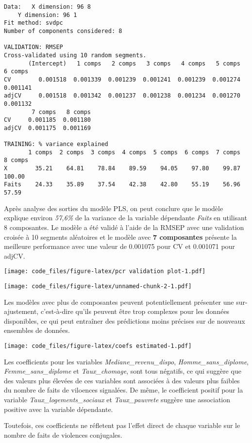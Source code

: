\documentclass[
]{article}
\begin{document}
\begin{verbatim}
Data:   X dimension: 96 8 
    Y dimension: 96 1
Fit method: svdpc
Number of components considered: 8

VALIDATION: RMSEP
Cross-validated using 10 random segments.
       (Intercept)   1 comps   2 comps   3 comps   4 comps   5 comps   6 comps
CV        0.001518  0.001339  0.001239  0.001241  0.001239  0.001274  0.001141
adjCV     0.001518  0.001342  0.001237  0.001238  0.001234  0.001270  0.001132
        7 comps   8 comps
CV     0.001185  0.001180
adjCV  0.001175  0.001169

TRAINING: % variance explained
       1 comps  2 comps  3 comps  4 comps  5 comps  6 comps  7 comps  8 comps
X        35.21    64.81    78.84    89.59    94.05    97.80    99.87   100.00
Faits    24.33    35.89    37.54    42.38    42.80    55.19    56.96    57.59
\end{verbatim}

Après analyse des sorties du modèle PLS, on peut conclure que le modèle
explique environ \emph{57,6\%} de la variance de la variable dépendante
\emph{Faits} en utilisant 8 composantes. Le modèle a été validé à l'aide
de la RMSEP avec une validation croisée à 10 segments aléatoires et le
modèle avec \textbf{7 composantes} présente la meilleure performance
avec une valeur de 0.001075 pour CV et 0.001071 pour adjCV.

\texttt{[image: code\_files/figure-latex/pcr validation plot-1.pdf]}

\texttt{[image: code\_files/figure-latex/unnamed-chunk-2-1.pdf]}

Les modèles avec plus de composantes peuvent potentiellement présenter
une sur-ajustement, c'est-à-dire qu'ils peuvent être trop complexes pour
les données disponibles, ce qui peut entraîner des prédictions moins
précises sur de nouveaux ensembles de données.

\texttt{[image: code\_files/figure-latex/coefs estimated-1.pdf]}

Les coefficients pour les variables \emph{Mediane\_revenu\_dispo},
\emph{Homme\_sans\_diplome}, \emph{Femme\_sans\_diplome} et
\emph{Taux\_chomage}, sont tous négatifs, ce qui suggère que des valeurs
plus élevées de ces variables sont associées à des valeurs plus faibles
du nombre de faits de viloences signalées. De même, le coefficient
positif pour la variable \emph{Taux\_logements\_sociaux} et
\emph{Taux\_pauvrete} suggère une association positive avec la variable
dépendante.

Toutefois, ces coefficients ne réfletent pas l'effet direct de chaque
variable sur le nombre de faits de violences conjugales.
\end{document}

